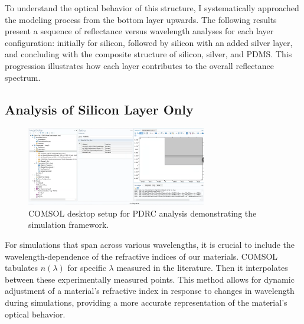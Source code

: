 To understand the optical behavior of this structure, I systematically approached the modeling process from the bottom layer upwards. The following results present a sequence of reflectance versus wavelength analyses for each layer configuration: initially for silicon, followed by silicon with an added silver layer, and concluding with the composite structure of silicon, silver, and PDMS. This progression illustrates how each layer contributes to the overall reflectance spectrum.


\subsection{Analysis of Silicon Layer Only}

\begin{figure}[H]
  \centering
  \includegraphics[width=0.7\textwidth]{Chapters/Figures/Chapter 4 Figures/COMSOL Desktop Layout for PDRC Analysis.png}
  \caption{COMSOL desktop setup for PDRC analysis demonstrating the simulation framework.}
  \label{fig:COMSOL-desktop-PDRC-setup}
\end{figure}

For simulations that span across various wavelengths, it is crucial to include the wavelength-dependence of the refractive indices of our materials. COMSOL tabulates $n(\lambda)$ for specific $\lambda$ measured in the literature. Then it interpolates between these experimentally measured points. This method allows for dynamic adjustment of a material's refractive index in response to changes in wavelength during simulations, providing a more accurate representation of the material's optical behavior.

